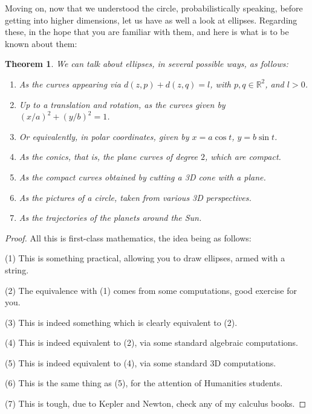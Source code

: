 \documentclass[12pt]{amsbook}
\newtheorem{theorem}{Theorem}[chapter]
\begin{document}
Moving on, now that we understood the circle, probabilistically speaking, before getting into higher dimensions, let us have as well a look at ellipses. Regarding these, in the hope that you are familiar with them, and here is what is to be known about them:


\begin{theorem}
We can talk about ellipses, in several possible ways, as follows:
\begin{enumerate}
\item As the curves appearing via $d(z,p)+d(z,q)=l$, with $p,q\in\mathbb R^2$, and $l>0$.

\item Up to a translation and rotation, as the curves given by $(x/a)^2+(y/b)^2=1$.

\item Or equivalently, in polar coordinates, given by $x=a\cos t$, $y=b\sin t$.

\item As the conics, that is, the plane curves of degree $2$, which are compact. 

\item As the compact curves obtained by cutting a 3D cone with a plane.

\item As the pictures of a circle, taken from various 3D perspectives.

\item As the trajectories of the planets around the Sun.
\end{enumerate}
\end{theorem}

\begin{proof}
All this is first-class mathematics, the idea being as follows:

\medskip

(1) This is something practical, allowing you to draw ellipses, armed with a string.

\medskip

(2) The equivalence with (1) comes from some computations, good exercise for you.

\medskip

(3) This is indeed something which is clearly equivalent to (2).

\medskip

(4) This is indeed equivalent to (2), via some standard algebraic computations.

\medskip

(5) This is indeed equivalent to (4), via some standard 3D computations.

\medskip

(6) This is the same thing as (5), for the attention of Humanities students.

\medskip

(7) This is tough, due to Kepler and Newton, check any of my calculus books.
\end{proof}
\end{document}
